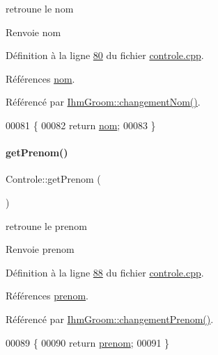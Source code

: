 retroune le nom 

\begin{DoxyReturn}{Renvoie}
nom 
\end{DoxyReturn}


Définition à la ligne \hyperlink{controle_8cpp_source_l00080}{80} du fichier \hyperlink{controle_8cpp_source}{controle.\+cpp}.



Références \hyperlink{controle_8h_source_l00073}{nom}.



Référencé par \hyperlink{ihmgroom_8cpp_source_l00065}{Ihm\+Groom\+::changement\+Nom()}.


\begin{DoxyCode}
00081 \{
00082     \textcolor{keywordflow}{return} \hyperlink{class_controle_ad47747a49ca21434f6d43d451d3cf134}{nom};
00083 \}
\end{DoxyCode}
\mbox{\label{class_controle_a0164fd9066b1703498576095ab5642c5}} 
\paragraph{\texorpdfstring{get\+Prenom()}{getPrenom()}}
{\footnotesize\ttfamily Controle\+::get\+Prenom (\begin{DoxyParamCaption}{ }\end{DoxyParamCaption})}



retroune le prenom 

\begin{DoxyReturn}{Renvoie}
prenom 
\end{DoxyReturn}


Définition à la ligne \hyperlink{controle_8cpp_source_l00088}{88} du fichier \hyperlink{controle_8cpp_source}{controle.\+cpp}.



Références \hyperlink{controle_8h_source_l00074}{prenom}.



Référencé par \hyperlink{ihmgroom_8cpp_source_l00070}{Ihm\+Groom\+::changement\+Prenom()}.


\begin{DoxyCode}
00089 \{
00090     \textcolor{keywordflow}{return} \hyperlink{class_controle_a29e37e25a6fd4643ddea3fef47e3bc51}{prenom};
00091 \}
\end{DoxyCode}
\mbox{\label{class_controle_abf7c9fefec4980b90c9f759d48fd17aa}} 
